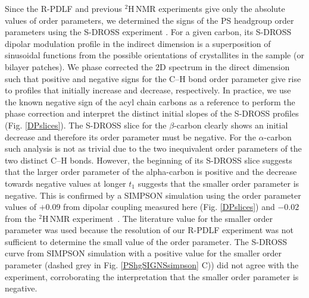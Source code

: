 \documentclass[aps,prl,superscriptaddress,twocolumn]{revtex4}
\begin{document}
Since the R-PDLF and previous $^2$H\,NMR experiments \cite{browning80,roux91} give 
only the absolute values of order parameters, we determined the signs of the PS headgroup
order parameters using the S-DROSS experiment \cite{gross97}.
For a given carbon, its S-DROSS dipolar modulation profile in the indirect dimension is a superposition
of sinusoidal functions from the possible orientations of crystallites in the sample (or bilayer patches).
We phase corrected the 2D spectrum in the direct dimension such that positive and negative signs for the C--H
bond order parameter give rise to profiles that initially increase and decrease, respectively.
In practice, we use the known negative sign of the acyl chain carbons as a reference to perform
the phase correction and interpret the distinct initial slopes of the S-DROSS profiles (Fig. \ref{DPslices}). 
The S-DROSS slice for the $\beta$-carbon clearly shows an initial decrease and therefore its order parameter must be negative.
For the $\alpha$-carbon such analysis is not as trivial due to the two inequivalent order parameters of the two distinct C--H bonds.
However, the beginning of its S-DROSS slice suggests that the larger order parameter of the alpha-carbon is positive and the
decrease towards negative values at longer $t_1$ suggests that the smaller order parameter is negative.    
%
%
This is confirmed by a SIMPSON simulation
using the order parameter values of $+0.09$ from dipolar coupling measured here (Fig. \ref{DPslices})
and $-0.02$ from the $^2$H\,NMR experiment~\cite{roux91}.
The literature value for the smaller order parameter was used because the
resolution of our R-PDLF experiment was not sufficient to determine the
small value of the order parameter.
The S-DROSS curve from SIMPSON simulation with a positive value for the smaller order parameter
(dashed grey in Fig. \ref{PShgSIGNSsimpson} C)) did not agree with the experiment, 
corroborating the interpretation that the smaller order parameter is negative.
\end{document}
